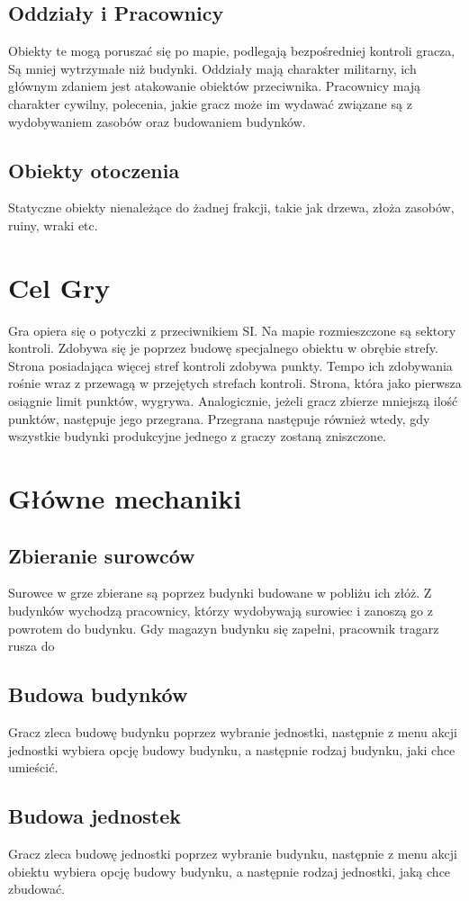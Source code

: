 \documentclass[a4paper]{scrreprt}
\begin{document}
\subsection{Oddziały i Pracownicy}
Obiekty te mogą poruszać się po mapie, podlegają bezpośredniej kontroli gracza, Są mniej wytrzymałe niż budynki. Oddziały mają charakter militarny, ich głównym zdaniem jest atakowanie obiektów przeciwnika. Pracownicy mają charakter cywilny, polecenia, jakie gracz może im wydawać związane są z wydobywaniem zasobów oraz budowaniem budynków.
\subsection{Obiekty otoczenia}
Statyczne obiekty nienależące do żadnej frakcji, takie jak drzewa, złoża zasobów, ruiny, wraki etc. 

\section{Cel Gry}
Gra opiera się o potyczki z przeciwnikiem SI. Na mapie rozmieszczone są sektory kontroli. Zdobywa się je poprzez budowę specjalnego obiektu w obrębie strefy. Strona posiadająca więcej stref kontroli zdobywa punkty. Tempo ich zdobywania rośnie wraz z przewagą w przejętych strefach kontroli. Strona, która jako pierwsza osiągnie limit punktów, wygrywa. Analogicznie, jeżeli gracz zbierze mniejszą ilość punktów, następuje jego przegrana. Przegrana następuje również wtedy, gdy wszystkie budynki produkcyjne jednego z graczy zostaną zniszczone.
\section{Główne mechaniki}
\subsection{Zbieranie surowców}
Surowce w grze zbierane są poprzez budynki budowane w pobliżu ich złóż. Z budynków wychodzą pracownicy, którzy wydobywają surowiec i zanoszą go z powrotem do budynku. Gdy magazyn budynku się zapełni, pracownik  tragarz rusza do 
\subsection{Budowa budynków} 
Gracz zleca budowę budynku poprzez wybranie jednostki, następnie z menu akcji jednostki wybiera opcję budowy budynku, a następnie rodzaj budynku, jaki chce umieścić. 
\subsection{Budowa jednostek}
Gracz zleca budowę jednostki poprzez wybranie budynku, następnie z menu akcji obiektu wybiera opcję budowy budynku, a następnie rodzaj jednostki, jaką chce zbudować. 
\end{document}
